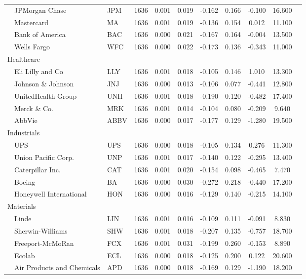 \documentclass{article}
\begin{document}
\begin{table}[H]
\begin{threeparttable}
\begin{tabular}{p{1.75cm}p{3.5cm}lcccccccc}
& JPMorgan Chase     & JPM  & 1636 & 0.001 & 0.019 & -0.162 & 0.166 & -0.100 & 16.600 \\
& Mastercard         & MA   & 1636 & 0.001 & 0.019 & -0.136 & 0.154 & 0.012  & 11.100 \\
& Bank of America    & BAC  & 1636 & 0.000 & 0.021 & -0.167 & 0.164 & -0.004 & 13.500 \\
& Wells Fargo        & WFC  & 1636 & 0.000 & 0.022 & -0.173 & 0.136 & -0.343 & 11.000 \\
\multicolumn{2}{l}{Healthcare}   \\[1mm]         
& Eli Lilly and Co   & LLY  & 1636 & 0.001 & 0.018 & -0.105 & 0.146 & 1.010 & 13.300 \\
& Johnson \& Johnson & JNJ  & 1636 & 0.000 & 0.013 & -0.106 & 0.077 & -0.441 & 12.800 \\
& UnitedHealth Group & UNH  & 1636 & 0.001 & 0.018 & -0.190 & 0.120 & -0.482 & 17.400 \\
& Merck \& Co.       & MRK  & 1636 & 0.001 & 0.014 & -0.104 & 0.080 & -0.209 & 9.640 \\
& AbbVie             & ABBV & 1636 & 0.000 & 0.017 & -0.177 & 0.129 & -1.280 & 19.500 \\
\multicolumn{2}{l}{Industrials}   \\[1mm]
& UPS                 & UPS  & 1636 & 0.000 & 0.018 & -0.105 & 0.134 & 0.276  & 11.300 \\
& Union Pacific Corp. & UNP  & 1636 & 0.001 & 0.017 & -0.140 & 0.122 & -0.295 & 13.400 \\
& Caterpillar Inc.    & CAT  & 1636 & 0.001 & 0.020 & -0.154 & 0.098 & -0.465 & 7.470  \\
& Boeing              & BA   & 1636 & 0.000 & 0.030 & -0.272 & 0.218 & -0.440 & 17.200 \\
& Honeywell International & HON & 1636 & 0.000 & 0.016 & -0.129 & 0.140 & -0.215 & 14.100 \\
\multicolumn{2}{l}{Materials}\\[1mm]
& Linde              & LIN & 1636 & 0.001 & 0.016 & -0.109 & 0.111 & -0.091 & 8.830 \\
& Sherwin-Williams   & SHW & 1636 & 0.001 & 0.018 & -0.207 & 0.135 & -0.757 & 18.700 \\
& Freeport-McMoRan   & FCX & 1636 & 0.001 & 0.031 & -0.199 & 0.260 & -0.153 & 8.890 \\
& Ecolab             & ECL & 1636 & 0.000 & 0.018 & -0.125 & 0.200 & 0.122  & 20.600 \\
& Air Products and Chemicals & APD & 1636 & 0.000 & 0.018 & -0.169 & 0.129 & -1.190 & 18.200 \\[1mm]

\end{tabular}
\end{threeparttable}
\end{table}
\end{document}
